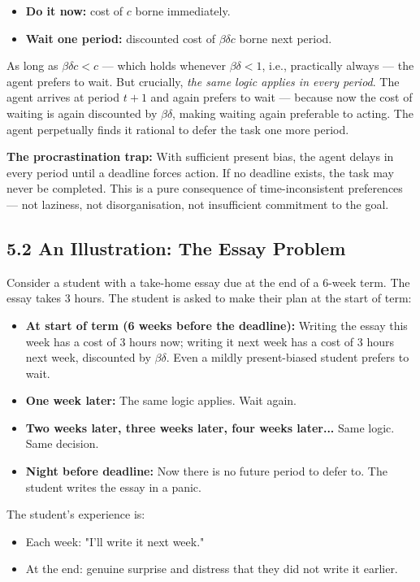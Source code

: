 \documentclass[12pt, letterpaper]{article}
\begin{document}
\begin{itemize}
\item \textbf{Do it now:} cost of $c$ borne immediately.
\item \textbf{Wait one period:} discounted cost of $\beta \delta c$ borne next period.
\end{itemize}

As long as $\beta \delta c < c$ --- which holds whenever $\beta \delta < 1$, i.e., practically always --- the agent prefers to wait. But crucially, \textit{the same logic applies in every period}. The agent arrives at period $t+1$ and again prefers to wait --- because now the cost of waiting is again discounted by $\beta\delta$, making waiting again preferable to acting. The agent perpetually finds it rational to defer the task one more period.

\textbf{The procrastination trap:} With sufficient present bias, the agent delays in every period until a deadline forces action. If no deadline exists, the task may never be completed. This is a pure consequence of time-inconsistent preferences --- not laziness, not disorganisation, not insufficient commitment to the goal.


\subsection{5.2 An Illustration: The Essay Problem}


Consider a student with a take-home essay due at the end of a 6-week term. The essay takes 3 hours. The student is asked to make their plan at the start of term:

\begin{itemize}
\item \textbf{At start of term (6 weeks before the deadline):} Writing the essay this week has a cost of 3 hours now; writing it next week has a cost of 3 hours next week, discounted by $\beta\delta$. Even a mildly present-biased student prefers to wait.
\item \textbf{One week later:} The same logic applies. Wait again.
\item \textbf{Two weeks later, three weeks later, four weeks later...} Same logic. Same decision.
\item \textbf{Night before deadline:} Now there is no future period to defer to. The student writes the essay in a panic.
\end{itemize}

The student's experience is:
\begin{itemize}
\item Each week: "I'll write it next week."
\item At the end: genuine surprise and distress that they did not write it earlier.
\end{itemize}
\end{document}
